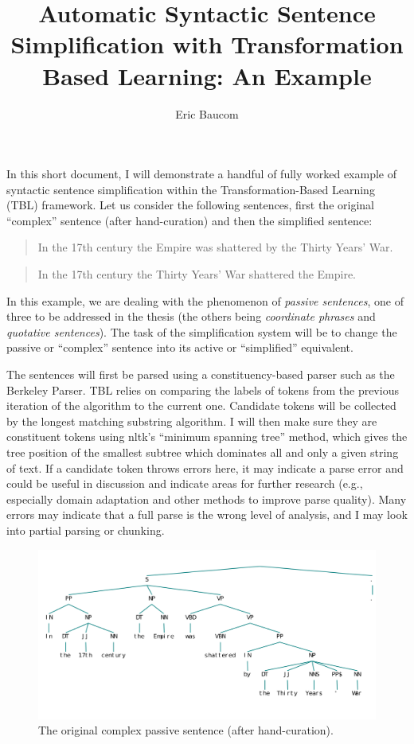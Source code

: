 \documentclass{article}
\begin{document}
\author{Eric Baucom}
\title{Automatic Syntactic Sentence Simplification with Transformation Based Learning: An Example}
\maketitle

In this short document, I will demonstrate a handful of fully worked example of syntactic sentence simplification within the Transformation-Based Learning (TBL) framework. Let us consider the following sentences, first the original ``complex'' sentence (after hand-curation) and then the simplified sentence:

\begin{quote}
In the 17th century the Empire was shattered by the Thirty Years' War.
\end{quote}

\begin{quote}
In the 17th century the Thirty Years' War shattered the Empire.
\end{quote}

In this example, we are dealing with the phenomenon of \textit{passive sentences}, one of three to be addressed in the thesis (the others being \textit{coordinate phrases} and \textit{quotative sentences}). The task of the simplification system will be to change the passive or ``complex'' sentence into its active or ``simplified'' equivalent.

The sentences will first be parsed using a constituency-based parser such as the Berkeley Parser. TBL relies on comparing the labels of tokens from the previous iteration of the algorithm to the current one. Candidate tokens will be collected by the longest matching substring algorithm. I will then make sure they are
constituent tokens using nltk's ``minimum spanning tree'' method, which gives the
tree position of the smallest subtree which dominates all and only a given
string of text. If a candidate token throws errors here, it may
indicate a parse error and could be useful in discussion and indicate
areas for further research (e.g., especially domain adaptation and other methods to improve parse quality). Many errors may indicate that a full
parse is the wrong level of analysis, and I may look into partial parsing or chunking.

\begin{figure}
\begin{center}
\includegraphics[scale=.65]{comp_pass}
\caption{The original complex passive sentence (after hand-curation).}
\end{center}
\end{figure}
\end{document}
